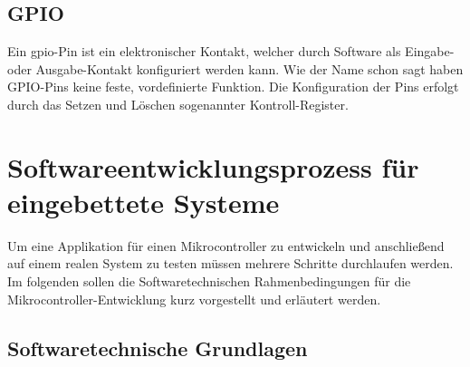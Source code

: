 \subsection{GPIO}
\label{sec:theo-basics-gpio}

Ein \ac{gpio}-Pin ist ein elektronischer Kontakt, welcher durch Software als
Eingabe- oder Ausgabe-Kontakt konfiguriert werden
kann\cite{Digitec_WGehrke_MWinzker}.
Wie der Name schon sagt haben GPIO-Pins keine feste, vordefinierte Funktion.
Die Konfiguration der Pins erfolgt durch das Setzen und Löschen sogenannter
Kontroll-Register.


\section{Softwareentwicklungsprozess für eingebettete Systeme}

Um eine Applikation für einen Mikrocontroller zu entwickeln und anschließend
auf einem realen System zu testen müssen mehrere Schritte durchlaufen werden.
Im folgenden sollen die Softwaretechnischen Rahmenbedingungen für die
Mikrocontroller-Entwicklung kurz vorgestellt und erläutert werden.

\subsection{Softwaretechnische Grundlagen}

